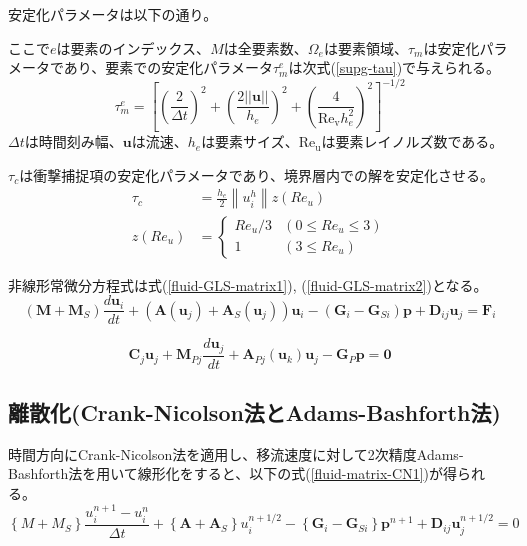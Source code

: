 安定化パラメータは以下の通り。

ここで$e$は要素のインデックス、$M$は全要素数、$\Omega_{e}$は要素領域、$\tau_{m}$は安定化パラメータであり、要素での安定化パラメータ$\tau_{m}^{e}$は次式(\ref{supg-tau})で与えられる。
\begin{equation}
\label{supg-tau}
	\tau_{m}^{e}=\left[ \left(\frac{2}{\Delta t}\right)^{2} + \left(\frac{2||\bm{u}||}{h_{e}}\right)^{2} + \left(\frac{4}{\mathrm{Re_{v}} h_{e}^{2}}\right)^{2}\right]^{-1/2}
\end{equation}
$\Delta t$は時間刻み幅、$\bm{u}$は流速、$h_e$は要素サイズ、$\mathrm{Re_u}$は要素レイノルズ数である。

$\tau_{c}$は衝撃捕捉項の安定化パラメータであり、境界層内での解を安定化させる。
\begin{equation}
	\begin{aligned} \tau_c & =\frac{h_e}{2}\left\|u_i^h\right\| z\left(R e_u\right) \\ z\left(R e_u\right) & = \begin{cases}R e_u / 3 & \left(0 \leq R e_u \leq 3\right) \\ 1 & \left(3 \leq R e_u\right)\end{cases} \end{aligned}
\end{equation}

非線形常微分方程式は式(\ref{fluid-GLS-matrix1}), (\ref{fluid-GLS-matrix2})となる。
\begin{equation}
\label{fluid-GLS-matrix1}
	\left(\bm{M}+\bm{M}_S\right) \frac{d \bm{u}_i}{d t} 
	+ \left(\bm{A}\left(\bm{u}_j\right)+\bm{A}_S\left(\bm{u}_j\right)\right) \bm{u}_i
	- \left(\bm{G}_i-\bm{G}_{S i}\right) \bm{p}
	+ \bm{D}_{i j} \bm{u}_j=\bm{F}_i
\end{equation}

\begin{equation}
\label{fluid-GLS-matrix2}
	\bm{C}_j \bm{u}_j+\bm{M}_{P j} \frac{d \bm{u}_j}{d t}
	+ \bm{A}_{P j}\left(\bm{u}_k\right) \bm{u}_j
	- \bm{G}_P \bm{p}=\mathbf{0}
\end{equation}

\subsection{離散化(Crank-Nicolson法とAdams-Bashforth法)}
時間方向にCrank-Nicolson法を適用し、移流速度に対して2次精度Adams-Bashforth法を用いて線形化をすると、以下の式(\ref{fluid-matrix-CN1})が得られる。
\begin{equation}
\label{fluid-matrix-CN1}
		\left\{M+M_S\right\} \frac{u_i^{n+1}-u_i^n}{\Delta t}+\left\{\bm{A}+\bm{A}_S\right\} u_i^{n+1 / 2}-\left\{\bm{G}_i-\bm{G}_{S i}\right\} \bm{p}^{n+1}+\bm{D}_{i j} \bm{u}_j^{n+1 / 2}=0
\end{equation}

